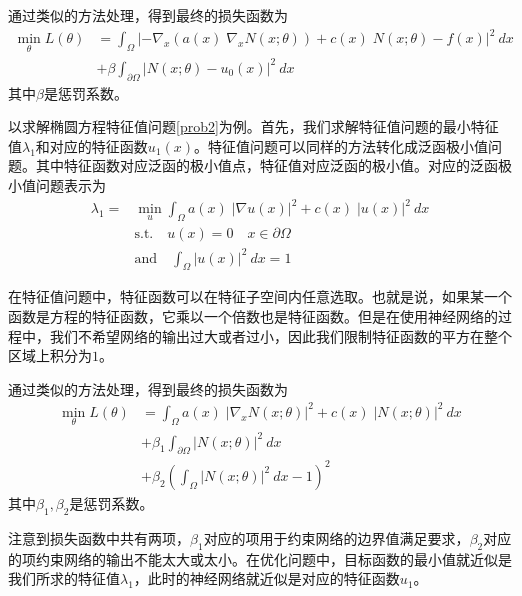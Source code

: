 通过类似的方法处理，得到最终的损失函数为
\begin{equation}
\begin{split}
\min_{\theta} L(\theta) & = \int_{\Omega} |-\nabla_x(a(x) \; \nabla_x N(x; \theta)) + c(x) \; N(x; \theta) - f(x)|^2 \ dx \\
& + \beta \int_{\partial \Omega} |N(x; \theta) - u_0(x)|^2 \ dx
\end{split}
\end{equation}
其中$\beta$是惩罚系数。


以求解椭圆方程特征值问题\eqref{prob2}为例。首先，我们求解特征值问题的最小特征值$\lambda_1$和对应的特征函数$u_1(x)$。特征值问题可以同样的方法转化成泛函极小值问题。其中特征函数对应泛函的极小值点，特征值对应泛函的极小值。对应的泛函极小值问题表示为
\begin{equation}
\begin{split}
\lambda_1 = & \min_{u} \int_{\Omega} a(x) \; |\nabla u(x)|^2 + c(x) \; |u(x)|^2 \ dx \\
& \text{s.t.} \quad u(x) = 0 \quad x \in \partial \Omega \\
& \text{and} \quad \int_{\Omega} |u(x)|^2 \ dx = 1
\end{split}
\end{equation}

在特征值问题中，特征函数可以在特征子空间内任意选取。也就是说，如果某一个函数是方程的特征函数，它乘以一个倍数也是特征函数。但是在使用神经网络的过程中，我们不希望网络的输出过大或者过小，因此我们限制特征函数的平方在整个区域上积分为$1$。

通过类似的方法处理，得到最终的损失函数为
\begin{equation}
\begin{split}
\min_{\theta} L(\theta) & = \int_{\Omega} a(x) \; |\nabla_x  N(x; \theta)|^2 + c(x) \; | N(x; \theta)|^2 \ dx \\
& + \beta_1 \int_{\partial \Omega} |N(x; \theta)|^2 \ dx \\
& + \beta_2 \left( \int_{\Omega} |N(x; \theta)|^2 \ dx - 1 \right)^2
\end{split}
\end{equation}
其中$\beta_1, \beta_2$是惩罚系数。

注意到损失函数中共有两项，$\beta_1$对应的项用于约束网络的边界值满足要求，$\beta_2$对应的项约束网络的输出不能太大或太小。在优化问题中，目标函数的最小值就近似是我们所求的特征值$\lambda_1$，此时的神经网络就近似是对应的特征函数$u_1$。

